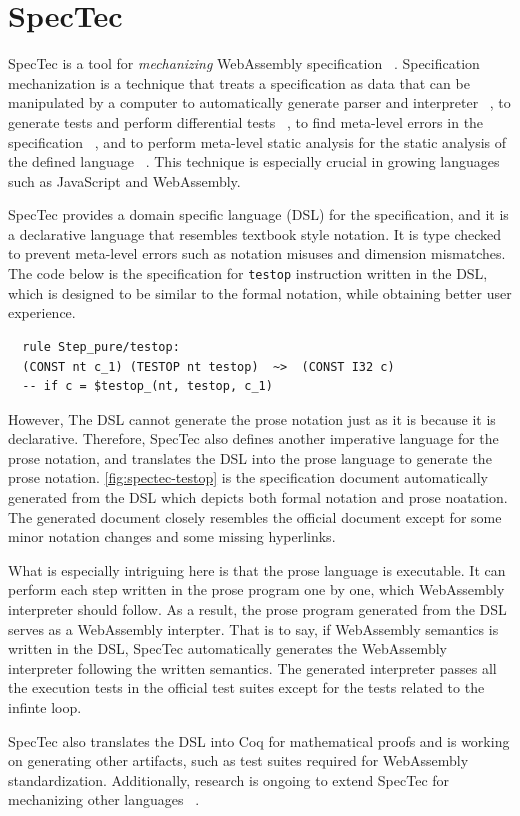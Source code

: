 \section{SpecTec}
\label{sec:spectec}


SpecTec is a tool for \textit{mechanizing} WebAssembly specification
~\cite{spectec}.
Specification mechanization is a technique that treats a specification as data
that can be manipulated by a computer to automatically generate parser and
interpreter ~\cite{jiset}, to generate tests and perform differential tests
~\cite{jest}, to find meta-level errors in the specification ~\cite{jstar}, and
to perform meta-level static analysis for the static analysis of the defined
language ~\cite{jsaver}.
This technique is especially crucial in growing languages such as JavaScript
and WebAssembly.


SpecTec provides a domain specific language (DSL) for the specification, and it
is a declarative language that resembles textbook style notation.
It is type checked to prevent meta-level errors such as notation misuses and
dimension mismatches. The code below is the specification for \texttt{testop}
instruction written in the DSL, which is designed to be similar to the formal
notation, while obtaining better user experience. \\
\begin{verbatim}
  rule Step_pure/testop:
  (CONST nt c_1) (TESTOP nt testop)  ~>  (CONST I32 c)
  -- if c = $testop_(nt, testop, c_1)
\end{verbatim}


However, The DSL cannot generate the prose notation just as it is because it is
declarative.
Therefore, SpecTec also defines another imperative language for the prose
notation, and translates the DSL into the prose language to generate the prose
notation.
\cref{fig:spectec-testop} is the specification document automatically
generated from the DSL which depicts both formal notation and prose noatation.
The generated document closely resembles the official document except for some
minor notation changes and some missing hyperlinks.


What is especially intriguing here is that the prose language is executable.
It can perform each step written in the prose program one by one, which
WebAssembly interpreter should follow.
As a result, the prose program generated from the DSL serves as a WebAssembly
interpter.
That is to say, if WebAssembly semantics is written in the DSL, SpecTec
automatically generates the WebAssembly interpreter following the written
semantics.
The generated interpreter passes all the execution tests in the official test
suites except for the tests related to the infinte loop.


SpecTec also translates the DSL into Coq for mathematical proofs and is working
on generating other artifacts, such as test suites required for WebAssembly
standardization.
Additionally, research is ongoing to extend SpecTec for mechanizing other
languages ~\cite{p4-cherry-workshop}.

